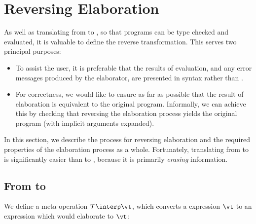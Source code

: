 \section{Reversing Elaboration}

\label{sect:delab}

As well as translating from \Idris{} to \TT{}, so that programs can be type
checked and evaluated, it is valuable to define the reverse transformation. This
serves two principal purposes:

\begin{itemize}
\item To assist the user, it is preferable that the results of evaluation, and any
error messages produced by the elaborator, are presented in \Idris{} syntax
rather than \TT{}.
\item For correctness, we would like to ensure as far as possible that the 
result of elaboration is equivalent to the original program. Informally, we can
achieve this by checking that reversing the elaboration process yields the original
program (with implicit arguments expanded).
\end{itemize}

\noindent
In this section, we describe the process for reversing elaboration and the required
properties of the elaboration process as a whole. Fortunately, translating from
\TT{} to \Idris{} is significantly easier than \Idris{} to \TT{}, because it is
primarily \emph{erasing} information.

\subsection{From \TT{} to \Idris{}}

We define a meta-operation $\uninterp{\vt}$, which converts a \TT{} expression
$\vt$ to an \Idris{} expression which would elaborate to $\vt$:



